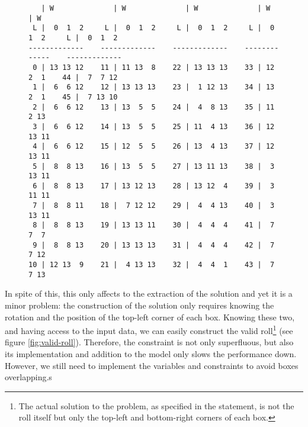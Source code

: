 \begin{figure}[H]
\centering
\begin{BVerbatim}
   | W              | W              | W              | W              | W       
 L |  0  1  2     L |  0  1  2     L |  0  1  2     L |  0  1  2     L |  0  1  2
-------------    -------------    -------------    -------------    -------------
 0 | 13 13 12    11 | 11 13  8    22 | 13 13 13    33 | 12  2  1    44 |  7  7 12
 1 |  6  6 12    12 | 13 13 13    23 |  1 12 13    34 | 13  2  1    45 |  7 13 10
 2 |  6  6 12    13 | 13  5  5    24 |  4  8 13    35 | 11  2 13
 3 |  6  6 12    14 | 13  5  5    25 | 11  4 13    36 | 12 13 11
 4 |  6  6 12    15 | 12  5  5    26 | 13  4 13    37 | 12 13 11
 5 |  8  8 13    16 | 13  5  5    27 | 13 11 13    38 |  3 13 11
 6 |  8  8 13    17 | 13 12 13    28 | 13 12  4    39 |  3 11 11
 7 |  8  8 11    18 |  7 12 12    29 |  4  4 13    40 |  3 13 11
 8 |  8  8 13    19 | 13 13 11    30 |  4  4  4    41 |  7  7  7
 9 |  8  8 13    20 | 13 13 13    31 |  4  4  4    42 |  7  7 12
10 | 12 13  9    21 |  4 13 13    32 |  4  4  1    43 |  7  7 13
\end{BVerbatim}
\label{fig:invalid-roll}
\end{figure}

In spite of this, this only affects to the extraction of the solution and yet it 
is a minor problem: the construction of the solution only requires knowing the
rotation and the position of the top-left corner of each box. Knowing these two,
and having access to the input data, we can easily construct the valid roll\footnote{The
actual solution to the problem, as specified in the statement, is not the roll
itself but only the top-left and bottom-right corners of each box.}
(see figure \ref{fig:valid-roll}). Therefore, the constraint is not only superfluous,
but also its implementation and addition to the model only slows the performance down.
However, we still need to implement the variables and constraints to avoid boxes
overlapping.s

